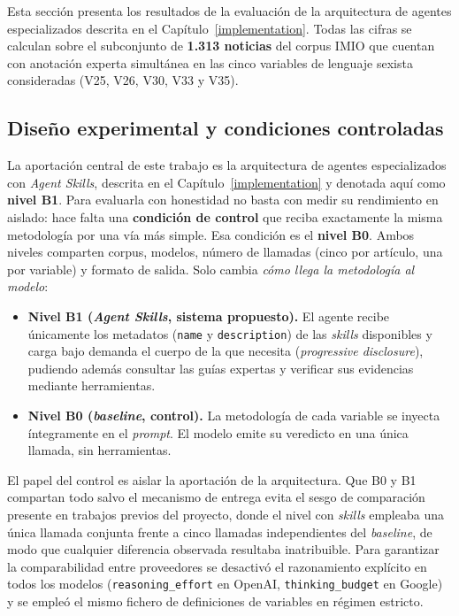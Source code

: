 
Esta sección presenta los resultados de la evaluación de la arquitectura de
agentes especializados descrita en el Capítulo~\ref{implementation}. Todas las
cifras se calculan sobre el subconjunto de \textbf{1.313 noticias} del corpus
IMIO que cuentan con anotación experta simultánea en las cinco variables de
lenguaje sexista consideradas (V25, V26, V30, V33 y V35).

\subsection{Diseño experimental y condiciones controladas}
\label{subsec:iris_diseno}

La aportación central de este trabajo es la arquitectura de agentes
especializados con \textit{Agent Skills}, descrita en el
Capítulo~\ref{implementation} y denotada aquí como \textbf{nivel B1}. Para
evaluarla con honestidad no basta con medir su rendimiento en aislado: hace falta
una \textbf{condición de control} que reciba exactamente la misma metodología por
una vía más simple. Esa condición es el \textbf{nivel B0}. Ambos niveles comparten
corpus, modelos, número de llamadas (cinco por artículo, una por variable) y
formato de salida. Solo cambia \emph{cómo llega la metodología al modelo}:

\begin{itemize}
    \item \textbf{Nivel B1 (\textit{Agent Skills}, sistema propuesto).} El agente
    recibe únicamente los metadatos (\texttt{name} y \texttt{description}) de las
    \textit{skills} disponibles y carga bajo demanda el cuerpo de la que necesita
    (\textit{progressive disclosure}), pudiendo además consultar las guías
    expertas y verificar sus evidencias mediante herramientas.
    \item \textbf{Nivel B0 (\textit{baseline}, control).} La metodología de cada
    variable se inyecta íntegramente en el \textit{prompt}. El modelo emite su
    veredicto en una única llamada, sin herramientas.
\end{itemize}

El papel del control es aislar la aportación de la arquitectura. Que B0 y B1
compartan todo salvo el mecanismo de entrega evita el sesgo de comparación
presente en trabajos previos del proyecto, donde el nivel con \textit{skills}
empleaba una única llamada conjunta frente a cinco llamadas independientes del
\textit{baseline}, de modo que cualquier diferencia observada resultaba
inatribuible. Para garantizar la
comparabilidad entre proveedores se desactivó el razonamiento explícito en
todos los modelos (\texttt{reasoning\_effort} en OpenAI,
\texttt{thinking\_budget} en Google) y se empleó el mismo fichero de
definiciones de variables en régimen estricto.

